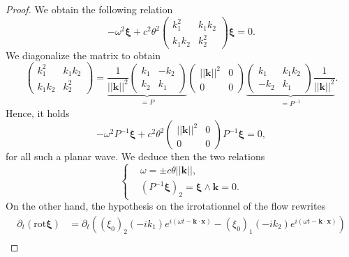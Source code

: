\documentclass[a4paper, 11pt]{report}
\begin{document}
\begin{proof}
We obtain the following relation
\begin{equation*}
-\omega^2\boldsymbol{\xi}+c^2\theta^2\begin{pmatrix}k_1^2 & k_1k_2\\ k_1k_2 & k_2^2\end{pmatrix}\boldsymbol{\xi}=0.
\end{equation*}
We diagonalize the matrix to obtain
\begin{equation*}
\begin{pmatrix}k_1^2 & k_1k_2\\ k_1k_2 & k_2^2\end{pmatrix}=\underbrace{\frac{1}{||\boldsymbol{k}||^2}\begin{pmatrix}k_1& -k_2\\ k_2 & k_1\end{pmatrix}}_{=P}\begin{pmatrix}||\boldsymbol{k}||^2&0\\ 0&0\end{pmatrix}\underbrace{\begin{pmatrix}k_1 & k_1k_2\\ -k_2 & k_1\end{pmatrix}\frac{1}{||\boldsymbol{k}||^2}}_{=P^{-1}}.
\end{equation*}
Hence, it holds
\begin{equation*}
-\omega^2P^{-1}\boldsymbol{\xi}+c^2\theta^2\begin{pmatrix}||\boldsymbol{k}||^2&0\\ 0&0\end{pmatrix}P^{-1}\boldsymbol{\xi}=0,
\end{equation*}
for all such a planar wave. 
We deduce then the two relations
\begin{equation*}
\left\{
\begin{split}
&\omega=\pm c\theta ||\boldsymbol{k}||,\\
&\left(P^{-1}\boldsymbol{\xi}\right)_2=\boldsymbol{\xi}\wedge\boldsymbol{k}=0.
\end{split}
\right.
\end{equation*}
On the other hand, the hypothesis on the irrotationnel of the flow rewrites
\begin{equation*}
\begin{split}
\partial_t(\boldsymbol{\mathrm{rot}}\boldsymbol{\xi})&=\partial_t \left(\left(\xi_0\right)_2(-ik_1)e^{i(\omega t-\boldsymbol{k}\cdot \boldsymbol{x})}-\left(\xi_0\right)_1(-ik_2)e^{i(\omega t-\boldsymbol{k}\cdot \boldsymbol{x})} \right)\\

\end{split}
\end{equation*}
\end{proof}
\end{document}
